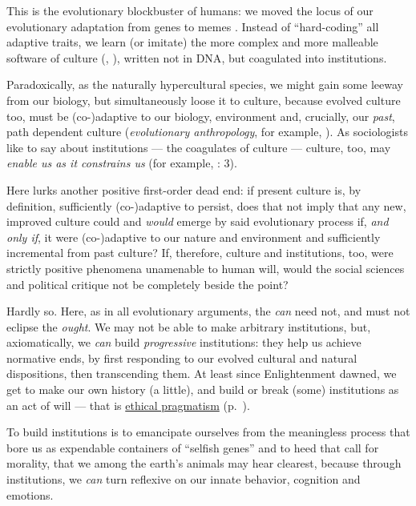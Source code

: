 This is the evolutionary blockbuster of humans: we moved the locus of our evolutionary adaptation from genes to memes \citep{Dawkins1976}.
Instead of ``hard-coding'' all adaptive traits, we learn (or imitate) the more complex and more malleable software of culture (\citealt{Boyd1985}, \citealt[K196ff]{Henrich2007}), written not in \gls{DNA}, but coagulated into institutions.

Paradoxically, as the naturally hypercultural species, we might gain some leeway from our biology, but simultaneously loose it to culture, because evolved culture too, must be (co-)adaptive to our biology, environment and, crucially, our \emph{past}, path dependent culture (\emph{evolutionary anthropology}, for example, \citealt{Wright2000}).
As sociologists like to say about institutions --- the coagulates of culture --- culture, too, may \emph{enable us as it constrains us} (for example, \citealt{Hodgson2006}: 3).

Here lurks another positive first-order dead end: if present culture is, by definition, sufficiently (co-)adaptive to persist, does that not imply that any new, improved culture could and \emph{would} emerge by said evolutionary process if, \emph{and only if}, it were (co-)adaptive to our nature and environment and sufficiently incremental from past culture?
If, therefore, culture and institutions, too, were strictly positive phenomena unamenable to human will, would the social sciences and political critique not be completely beside the point? %

Hardly so.
Here, as in all evolutionary arguments, the \emph{can} need not, and must not eclipse the \emph{ought}.
We may not be able to make arbitrary institutions, but, axiomatically, we \emph{can} build \emph{progressive} institutions: they help us achieve normative ends, by first responding to our evolved cultural and natural dispositions, then transcending them.
At least since Enlightenment dawned, we get to make our own history (a little), and build or break (some) institutions as an act of will --- that is \hyperref[itm:pragmatic-ethics]{ethical pragmatism} (p.~\pageref{itm:pragmatic-ethics}).

To build institutions is to emancipate ourselves from the meaningless process that bore us as expendable containers of ``selfish genes'' \citep{Dawkins1976} and to heed that call for morality, that we among the earth's animals may hear clearest, because through institutions, we \emph{can} turn reflexive on our innate behavior, cognition and emotions.

